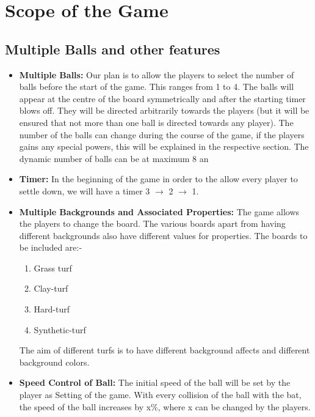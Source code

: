 \documentclass{article}
\begin{document}
\section{Scope of the Game}
\subsection{Multiple Balls and other features}
\begin{itemize}
\item \textbf{Multiple Balls:} Our plan is to allow the players to select the number of balls before the start of the game. This ranges from 1 to 4. The balls will appear at the centre of the board symmetrically and after the starting timer blows off. They will be directed arbitrarily towards the players (but it will be ensured that not more than one ball is directed towards any player). The number of the balls can change during the course of the game, if the players gains any special powers, this will be explained in the respective section. The dynamic number of balls can be at maximum 8 an
\item \textbf{Timer:} In the beginning of the game in order to the allow every player to settle down, we will have a timer 3 $\to$ 2 $\to$ 1.
\item \textbf{Multiple Backgrounds and Associated Properties:} The game allows the players to change the board. The various boards apart from having different backgrounds also have different values for properties. The boards to be included are:-
\begin{enumerate}
    \item Grass turf
    \item Clay-turf
    \item Hard-turf
    \item Synthetic-turf
\end{enumerate}
The aim of different turfs is to have different background affects and different background colors.
\item \textbf{Speed Control of Ball:} The initial speed of the ball will be set by the player as Setting of the game. With every collision of the ball with the bat, the speed of the ball increases by x\%, where x can be changed by the players.

\end{itemize}
\end{document}
